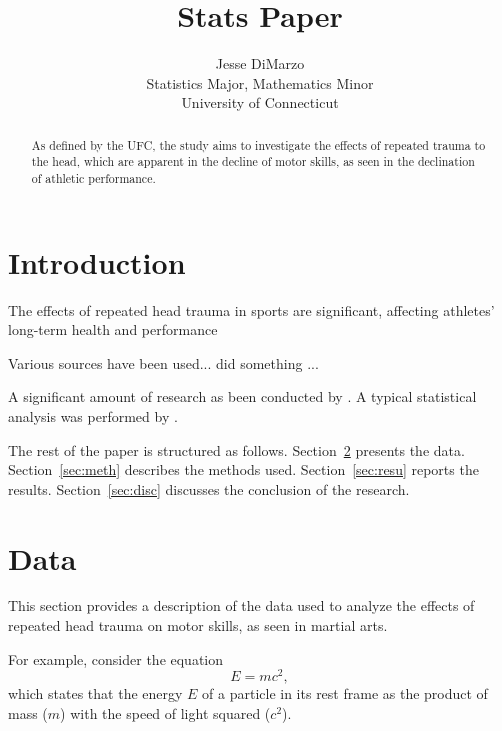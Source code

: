\documentclass[12pt]{article}
\title{Stats Paper}
\author{Jesse DiMarzo\\
  Statistics Major, Mathematics Minor \\
  University of Connecticut
}
\begin{document}
\maketitle

\begin{abstract}

\begin{acronym}
\end{acronym}

As defined by the \ac{UFC}, the study aims to investigate the effects of repeated trauma to the head, which are apparent in the decline of motor skills, as seen in the declination of athletic performance.

\end{abstract}

\doublespacing

\section{Introduction}
\label{sec:intro}


The effects of repeated head trauma in sports are significant, affecting athletes' long-term health and performance

\lipsum[1]

Various sources have been used...
\citet{smith2020study} did something ... \lipsum[1]

A significant amount of research as been conducted by \citep[e.g.,][]{smith2020study}.
\lipsum[1]
A typical statistical analysis was performed by
\citet{smith2020analysis}. 


The rest of the paper is structured as follows.
Section~\ref{sec:data} presents the data.
Section~\ref{sec:meth} describes the methods used.
Section~\ref{sec:resu} reports the results.
Section~\ref{sec:disc} discusses the conclusion of the research.


\section{Data}
\label{sec:data}

This section provides a description of the data used to analyze the effects of 
repeated head trauma on motor skills, as seen in martial arts.

For example, consider the equation
\begin{equation}
  \label{eq:mc2}
  E = m c^2,
\end{equation}
which states that the energy $E$ of a particle in its rest frame as the product
of mass ($m$) with the speed of light squared ($c^2$).
\end{document}
